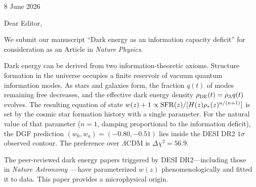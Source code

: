 \documentclass[12pt]{article}
\begin{document}
\begin{flushright}
8 June 2026
\end{flushright}

\vspace{8pt}

\noindent Dear Editor,

\vspace{8pt}

\noindent We submit our manuscript ``Dark energy as an information capacity deficit'' for consideration as an Article in {\it Nature Physics}.

\vspace{8pt}


Dark energy can be derived from two information-theoretic axioms. Structure formation in the universe occupies a finite reservoir of vacuum quantum information modes. As stars and galaxies form, the fraction $q(t)$ of modes remaining free decreases, and the effective dark energy density $\rho_{\rm DE}(t)=\rho_\Lambda q(t)$ evolves. The resulting equation of state $w(z)+1\propto{\rm SFR}(z)/[H(z)\rho_*(z)^{n/(n+1)}]$ is set by the cosmic star formation history with a single parameter. For the natural value of that parameter ($n=1$, damping proportional to the information deficit), the DGF prediction $(w_0,w_a)=(-0.80,-0.51)$ lies inside the DESI DR2 $1\sigma$ observed contour. The preference over $\Lambda$CDM is $\Delta\chi^2=56.9$.

The peer-reviewed dark energy papers triggered by DESI DR2---including those in {\it Nature Astronomy}~\cite{desi2025natast}---have parameterized $w(z)$ phenomenologically and fitted it to data. This paper provides a microphysical origin.

\vspace{8pt}

\end{document}
